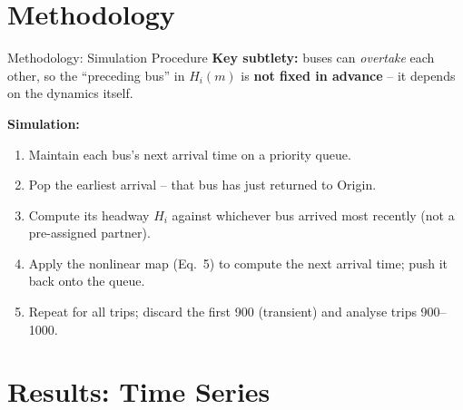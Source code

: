 \documentclass[t, aspectratio=169]{beamer}
\begin{document}
\section{Methodology}

\begin{frame}{Methodology: Simulation Procedure}
	\textbf{Key subtlety:} buses can \emph{overtake} each other, so the ``preceding bus'' in $H_i(m)$ is \textbf{not fixed in advance} -- it depends on the dynamics itself.

	\vspace{0.5em}
	\textbf{Simulation:}
	\begin{enumerate}
		\item Maintain each bus's next arrival time on a priority queue.
		\item Pop the earliest arrival -- that bus has just returned to Origin.
		\item Compute its headway $H_i$ against whichever bus arrived most recently (not a pre-assigned partner).
		\item Apply the nonlinear map (Eq.~5) to compute the next arrival time; push it back onto the queue.
		\item Repeat for all trips; discard the first 900 (transient) and analyse trips 900--1000.
	\end{enumerate}

	\vspace{0.3em}
\end{frame}

\section{Results: Time Series}
\end{document}
